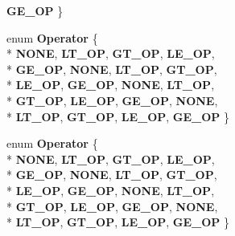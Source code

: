 \begin{DoxyCompactItemize}
{\bfseries G\-E\-\_\-\-O\-P}
 \}
\item 
enum {\bfseries Operator} \{ \\*
{\bfseries N\-O\-N\-E}, 
{\bfseries L\-T\-\_\-\-O\-P}, 
{\bfseries G\-T\-\_\-\-O\-P}, 
{\bfseries L\-E\-\_\-\-O\-P}, 
\\*
{\bfseries G\-E\-\_\-\-O\-P}, 
{\bfseries N\-O\-N\-E}, 
{\bfseries L\-T\-\_\-\-O\-P}, 
{\bfseries G\-T\-\_\-\-O\-P}, 
\\*
{\bfseries L\-E\-\_\-\-O\-P}, 
{\bfseries G\-E\-\_\-\-O\-P}, 
{\bfseries N\-O\-N\-E}, 
{\bfseries L\-T\-\_\-\-O\-P}, 
\\*
{\bfseries G\-T\-\_\-\-O\-P}, 
{\bfseries L\-E\-\_\-\-O\-P}, 
{\bfseries G\-E\-\_\-\-O\-P}, 
{\bfseries N\-O\-N\-E}, 
\\*
{\bfseries L\-T\-\_\-\-O\-P}, 
{\bfseries G\-T\-\_\-\-O\-P}, 
{\bfseries L\-E\-\_\-\-O\-P}, 
{\bfseries G\-E\-\_\-\-O\-P}
 \}
\item 
enum {\bfseries Operator} \{ \\*
{\bfseries N\-O\-N\-E}, 
{\bfseries L\-T\-\_\-\-O\-P}, 
{\bfseries G\-T\-\_\-\-O\-P}, 
{\bfseries L\-E\-\_\-\-O\-P}, 
\\*
{\bfseries G\-E\-\_\-\-O\-P}, 
{\bfseries N\-O\-N\-E}, 
{\bfseries L\-T\-\_\-\-O\-P}, 
{\bfseries G\-T\-\_\-\-O\-P}, 
\\*
{\bfseries L\-E\-\_\-\-O\-P}, 
{\bfseries G\-E\-\_\-\-O\-P}, 
{\bfseries N\-O\-N\-E}, 
{\bfseries L\-T\-\_\-\-O\-P}, 
\\*
{\bfseries G\-T\-\_\-\-O\-P}, 
{\bfseries L\-E\-\_\-\-O\-P}, 
{\bfseries G\-E\-\_\-\-O\-P}, 
{\bfseries N\-O\-N\-E}, 
\\*
{\bfseries L\-T\-\_\-\-O\-P}, 
{\bfseries G\-T\-\_\-\-O\-P}, 
{\bfseries L\-E\-\_\-\-O\-P}, 
{\bfseries G\-E\-\_\-\-O\-P}
 \}
\end{DoxyCompactItemize}
